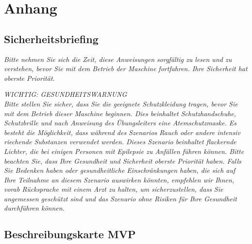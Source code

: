\section*{Anhang}
\label{sec:anhang}

\subsection*{Sicherheitsbriefing}\hspace{0pt}
\emph{Bitte nehmen Sie sich die Zeit, diese Anweisungen sorgfältig zu lesen und zu verstehen, bevor Sie mit dem Betrieb der Maschine fortfahren. Ihre Sicherheit hat oberste Priorität.}

\emph{WICHTIG: GESUNDHEITSWARNUNG} \\

\emph{Bitte stellen Sie sicher, dass Sie die geeignete Schutzkleidung tragen, bevor Sie mit dem Betrieb dieser Maschine beginnen. Dies beinhaltet Schutzhandschuhe, Schutzbrille und nach Anweisung des Übungsleiters eine Atemschutzmaske. 
Es besteht die Möglichkeit, dass während des Szenarios Rauch oder andere intensiv riechende Substanzen verwendet werden.
Dieses Szenario beinhaltet flackernde Lichter, die bei einigen Personen mit Epilepsie zu Anfällen führen können. Bitte beachten Sie, dass Ihre Gesundheit und Sicherheit oberste Priorität haben. Falls Sie Bedenken haben oder gesundheitliche Einschränkungen haben, die sich auf Ihre Teilnahme an diesem Szenario auswirken könnten, empfehlen wir Ihnen, vorab Rücksprache mit einem Arzt zu halten, um sicherzustellen, dass Sie angemessen geschützt sind und das Szenario ohne Risiken für Ihre Gesundheit durchführen können.}

\subsection*{Beschreibungskarte MVP}

